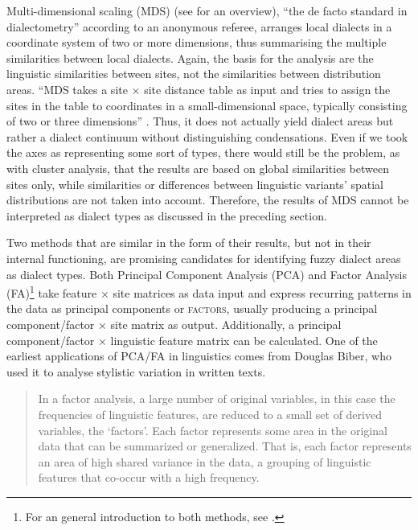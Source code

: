 \documentclass[output=paper]{LSP/langsci}
\begin{document}
Multi-dimensional scaling (MDS) (see \citealt[245]{wieling_advances_2015} for an overview), “the de facto standard in dialectometry” according to an anonymous referee, arranges local dialects in a coordinate system of two or more dimensions, thus summarising the multiple similarities between local dialects. Again, the basis for the analysis are the linguistic similarities between sites, not the similarities between distribution areas. “MDS takes a site × site distance table as input and tries to assign the sites in the table to coordinates in a small-dimensional space, typically consisting of two or three dimensions” \citep[245]{wieling_advances_2015}. Thus, it does not actually yield dialect areas but rather a dialect continuum without distinguishing condensations. Even if we took the axes as representing some sort of types, there would still be the problem, as with cluster analysis, that the results are based on global similarities between sites only, while similarities or differences between linguistic variants’ spatial distributions are not taken into account. Therefore, the results of MDS cannot be interpreted as dialect types as discussed in the preceding section.

Two methods that are similar in the form of their results, but not in their internal functioning, are promising candidates for identifying fuzzy dialect areas as dialect types. Both Principal Component Analysis (PCA) and Factor Analysis (FA)\footnote{For an general introduction to both methods, see \citet{tabachnick_using_2012}.} take feature × site matrices as data input and express recurring patterns in the data as principal components or \textsc{factors}, usually producing a principal component/factor × site matrix as output. Additionally, a principal component/factor × linguistic feature matrix can be calculated. One of the earliest applications of PCA/FA in linguistics comes from Douglas Biber, who used it to analyse stylistic variation in written texts.

\begin{quote}
In a factor analysis, a large number of original variables, in this case the frequencies of linguistic features, are reduced to a small set of derived variables, the `factors'. Each factor represents some area in the original data that can be summarized or generalized. That is, each factor represents an area of high shared variance in the data, a grouping of linguistic features that co-occur with a high frequency. \citep[79]{biber_variation_1988}
\end{quote}
\end{document}
